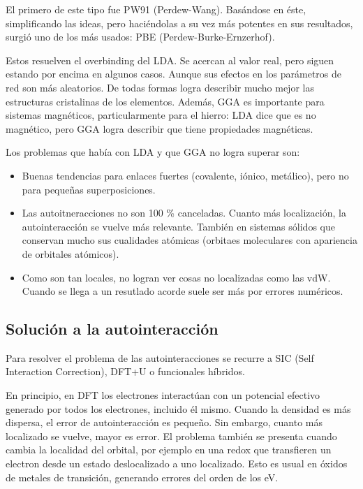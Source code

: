   El primero de este tipo fue PW91 (Perdew-Wang). Basándose en éste, simplificando las ideas, pero haciéndolas a su vez más potentes en sus resultados, surgió uno de los más usados: PBE (Perdew-Burke-Ernzerhof).

  Estos resuelven el overbinding del LDA. Se acercan al valor real, pero siguen estando por encima en algunos casos. Aunque sus efectos en los parámetros de red son más aleatorios. De todas formas logra describir mucho mejor las estructuras cristalinas de los elementos. Además, GGA es importante para sistemas magnéticos, particularmente para el hierro: LDA dice que es no magnético, pero GGA logra describir que tiene propiedades magnéticas.

  Los problemas que había con LDA y que GGA no logra superar son:
    \begin{itemize}
      \item Buenas tendencias para enlaces fuertes (covalente, iónico, metálico), pero no para pequeñas superposiciones.
      \item Las autoitneracciones no son 100 \% canceladas. Cuanto más localización, la autointeracción se vuelve más relevante. También en sistemas sólidos que conservan mucho sus cualidades atómicas (orbitaes moleculares con apariencia de orbitales atómicos).
      \item Como son tan locales, no logran ver cosas no localizadas como las vdW. Cuando se llega a un resutlado acorde suele ser más por errores numéricos.
    \end{itemize}

\subsection{Solución a la autointeracción}

  Para resolver el problema de las autointeracciones se recurre a SIC (Self Interaction Correction), DFT+U o funcionales híbridos.

  En principio, en DFT los electrones interactúan con un potencial efectivo generado por todos los electrones, incluido él mismo. Cuando la densidad es más dispersa, el error de autointeracción es pequeño. Sin embargo, cuanto más localizado se vuelve, mayor es error. El problema también se presenta cuando cambia la localidad del orbital, por ejemplo en una redox que transfieren un electron desde un estado deslocalizado a uno localizado. Esto es usual en óxidos de metales de transición, generando errores del orden de los eV.

